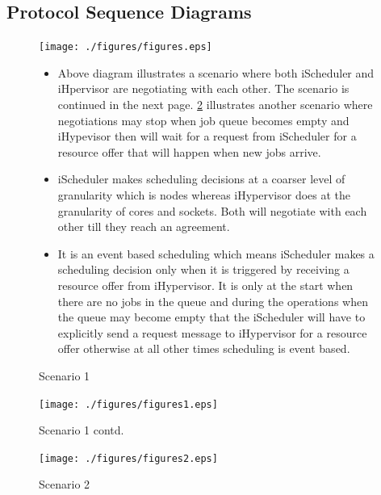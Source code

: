 \subsection{Protocol Sequence Diagrams}
\vspace{-0.15in}
\begin{figure}[!htbp]
\centering
\texttt{[image: ./figures/figures.eps]}
\caption{Scenario 1}
\begin{itemize}
\item Above diagram illustrates a scenario where both iScheduler and iHpervisor are negotiating with each other. The scenario is continued in the next page. \ref{fig:Seq2} illustrates another scenario where negotiations may stop when job queue becomes empty and iHypevisor then will wait for a request from iScheduler for a resource offer that will happen when new jobs arrive.
\item iScheduler makes scheduling decisions at a coarser level of granularity which is nodes whereas iHypervisor does at the granularity of cores and sockets. Both will negotiate with each other till they reach an agreement.
\item It is an event based scheduling which means iScheduler makes a scheduling decision only when it is triggered by receiving a resource offer from iHypervisor. It is only at the start when there are no jobs in the queue and during the operations when the queue may become empty that the iScheduler will have to explicitly send a request message to iHypervisor for a resource offer otherwise at all other times scheduling is event based.
\end{itemize}
\label{fig:Seq1}
\end{figure}
\vspace{-0.25in}
\begin{figure}[!htbp]
\centering
\texttt{[image: ./figures/figures1.eps]}
\caption{Scenario 1 contd.}
\label{fig:Seq1}
\vspace{0.25in}
\centering
\texttt{[image: ./figures/figures2.eps]}
\caption{Scenario 2}
\label{fig:Seq2}
\end{figure}
